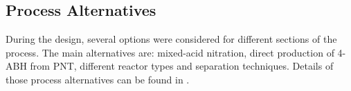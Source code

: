\subsection{Process Alternatives}
During the design, several options were considered for different sections of the process. The main alternatives are: mixed-acid  nitration, direct production of 4-ABH from PNT, different reactor types and separation techniques. Details of those process alternatives can be found in .




